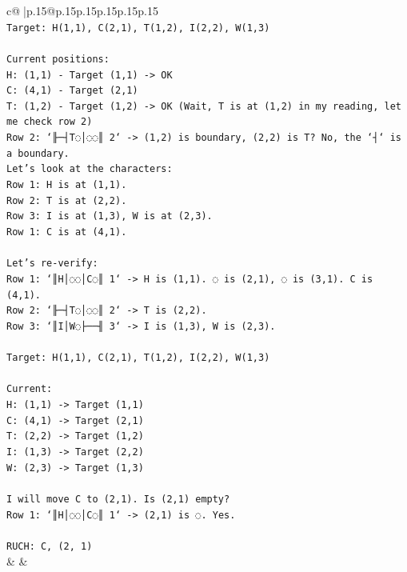 \documentclass{article}
\begin{document}
{\begin{supertabular}{c@{$\;$}|p{.15\linewidth}@{}p{.15\linewidth}p{.15\linewidth}p{.15\linewidth}p{.15\linewidth}p{.15\linewidth}}
{{{\\ 
\texttt{Target: H(1,1), C(2,1), T(1,2), I(2,2), W(1,3)} \\
\\ 
\texttt{Current positions:} \\
\texttt{H: (1,1) {-} Target (1,1) {-}> OK} \\
\texttt{C: (4,1) {-} Target (2,1)} \\
\texttt{T: (1,2) {-} Target (1,2) {-}> OK (Wait, T is at (1,2) in my reading, let me check row 2)} \\
\texttt{Row 2: `╟─┤T◌│◌◌║ 2` {-}> (1,2) is boundary, (2,2) is T? No, the `┤` is a boundary.} \\
\texttt{Let's look at the characters:} \\
\texttt{Row 1: H is at (1,1).} \\
\texttt{Row 2: T is at (2,2).} \\
\texttt{Row 3: I is at (1,3), W is at (2,3).} \\
\texttt{Row 1: C is at (4,1).} \\
\\ 
\texttt{Let's re{-}verify:} \\
\texttt{Row 1: `║H│◌◌│C◌║ 1` {-}> H is (1,1). ◌ is (2,1), ◌ is (3,1). C is (4,1).} \\
\texttt{Row 2: `╟─┤T◌│◌◌║ 2` {-}> T is (2,2).} \\
\texttt{Row 3: `║I│W◌├──╢ 3` {-}> I is (1,3), W is (2,3).} \\
\\ 
\texttt{Target: H(1,1), C(2,1), T(1,2), I(2,2), W(1,3)} \\
\\ 
\texttt{Current:} \\
\texttt{H: (1,1) {-}> Target (1,1)} \\
\texttt{C: (4,1) {-}> Target (2,1)} \\
\texttt{T: (2,2) {-}> Target (1,2)} \\
\texttt{I: (1,3) {-}> Target (2,2)} \\
\texttt{W: (2,3) {-}> Target (1,3)} \\
\\ 
\texttt{I will move C to (2,1). Is (2,1) empty?} \\
\texttt{Row 1: `║H│◌◌│C◌║ 1` {-}> (2,1) is ◌. Yes.} \\
\\ 
\texttt{RUCH: C, (2, 1)} \\
            }
        }
    }
    & & \\ \\


\end{supertabular}}
\end{document}
